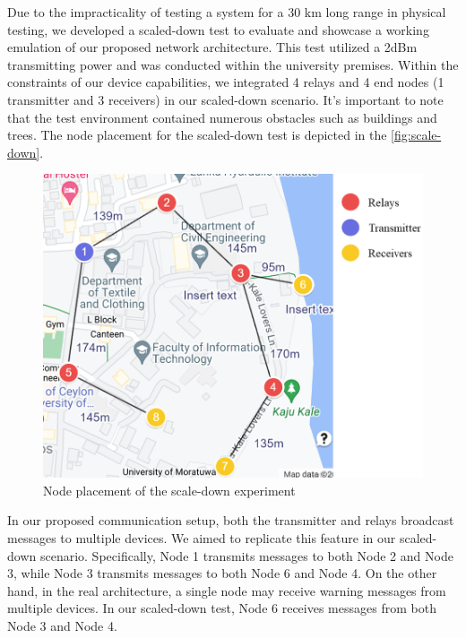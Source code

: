 \hspace{12pt} Due to the impracticality of testing a system for a 30 km long range in physical testing, we developed a scaled-down test to evaluate and showcase a working emulation of our proposed network architecture. This test utilized a 2dBm transmitting power and was conducted within the university premises. Within the constraints of our device capabilities, we integrated 4 relays and 4 end nodes (1 transmitter and 3 receivers) in our scaled-down scenario. It's important to note that the test environment contained numerous obstacles such as buildings and trees. The node placement for the scaled-down test is depicted in the \autoref{fig:scale-down}.\\

\begin{figure}[ht!]
    \centering
    \includegraphics[scale=0.6]{images/scale-down-map.png}
    \caption{Node placement of the scale-down experiment}
    \label{fig:scale-down}
\end{figure}

In our proposed communication setup, both the transmitter and relays broadcast messages to multiple devices. We aimed to replicate this feature in our scaled-down scenario. Specifically, Node 1 transmits messages to both Node 2 and Node 3, while Node 3 transmits messages to both Node 6 and Node 4. On the other hand, in the real architecture, a single node may receive warning messages from multiple devices. In our scaled-down test, Node 6 receives messages from both Node 3 and Node 4.\\


